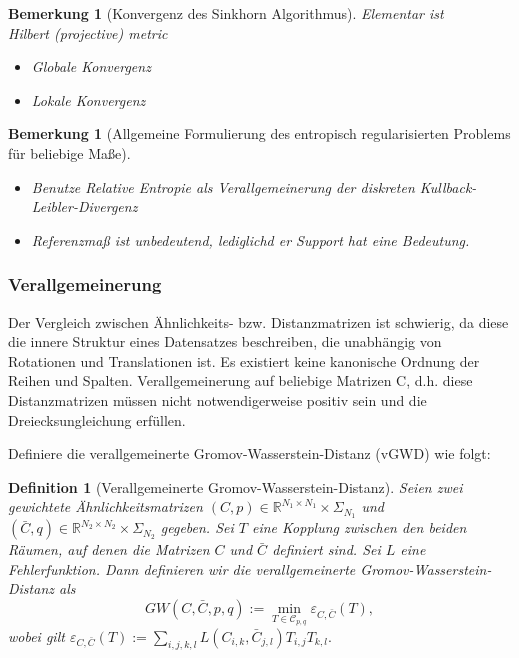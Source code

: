 \documentclass[twoside, 11pt,a4paper]{article}
\newtheorem{definition}[theorem]{Definition}
\newtheorem{remark}[theorem]{Bemerkung}
\numberwithin{equation}{section}
\begin{document}
	\begin{remark}[Konvergenz des Sinkhorn Algorithmus]
		Elementar ist \cite{franklin_sinkhorn_convergence}\\
		Hilbert (projective) metric
		
		\begin{itemize}
			\item Globale Konvergenz
			\item Lokale Konvergenz
		\end{itemize}
	\end{remark}
	\begin{remark}[Allgemeine Formulierung des entropisch regularisierten Problems für beliebige Maße]
		\leavevmode 
		\begin{itemize}
			\item Benutze Relative Entropie als Verallgemeinerung der diskreten Kullback-Leibler-Divergenz
			\item Referenzmaß ist unbedeutend, lediglichd er Support hat eine Bedeutung.
		\end{itemize}
	\end{remark}
	\subsubsection{Verallgemeinerung}
	Der Vergleich zwischen Ähnlichkeits- bzw. Distanzmatrizen ist schwierig, da diese die innere Struktur eines Datensatzes beschreiben, die unabhängig von Rotationen und Translationen ist. Es existiert keine kanonische Ordnung der Reihen und Spalten.
	Verallgemeinerung auf beliebige  Matrizen C, d.h. diese Distanzmatrizen müssen nicht notwendigerweise positiv sein und die Dreiecksungleichung erfüllen.
	
	Definiere die verallgemeinerte Gromov-Wasserstein-Distanz (vGWD) wie folgt:
	
	\begin{definition}[Verallgemeinerte Gromov-Wasserstein-Distanz]
		Seien zwei gewichtete Ähnlichkeitsmatrizen $(C,p) \in \mathbb{R}^{N_1 \times N_1} \times \Sigma_{N_1}$ und $(\bar{C},q) \in \mathbb{R}^{N_2 \times N_2} \times \Sigma_{N_2}$ gegeben. Sei $T$ eine Kopplung zwischen den beiden Räumen, auf denen die Matrizen $C$ und $\bar{C}$ definiert sind. Sei $L$ eine Fehlerfunktion. Dann definieren wir die verallgemeinerte Gromov-Wasserstein-Distanz als
		\begin{equation} \label{GWD_definition}
		GW(C, \bar{C}, p, q) := \min_{T \in \mathcal{C}_{p, q}}{\mathcal{\varepsilon}_{C,\bar{C}}(T)},
		\end{equation}
		wobei gilt $\mathcal{\varepsilon}_{C,\bar{C}}(T) := \sum_{i,j,k,l}{L(C_{i,k}, \bar{C}_{j,l})T_{i,j}T_{k,l}}.$
		
	\end{definition}
	
\end{document}
